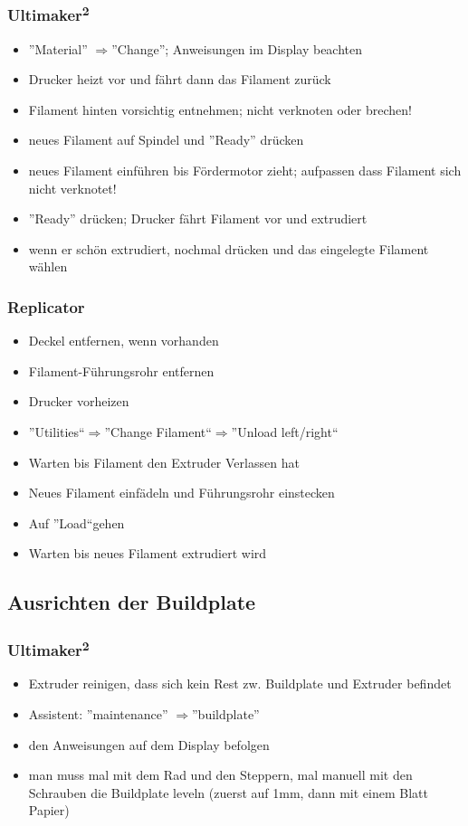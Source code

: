 \documentclass{\basedir/fablab-document}
\newcommand{\ts}[1]{\textsuperscript{#1}}
\newcommand{\ra}{$\Rightarrow$}
\begin{document}
\subsubsection{Ultimaker\ts2}
\begin{itemize}
    \item ''Material'' \ra ''Change''; Anweisungen im Display beachten
    \item Drucker heizt vor und fährt dann das Filament zurück
    \item Filament hinten vorsichtig entnehmen; nicht verknoten oder brechen!
    \item neues Filament auf Spindel und ''Ready'' drücken
    \item neues Filament einführen bis Fördermotor zieht; aufpassen dass Filament sich nicht verknotet!
    \item ''Ready'' drücken; Drucker fährt Filament vor und extrudiert
    \item wenn er schön extrudiert, nochmal drücken und das eingelegte Filament wählen
\end{itemize}

\subsubsection{Replicator}
\begin{itemize}
	\item Deckel entfernen, wenn vorhanden
	\item Filament-Führungsrohr entfernen
	\item Drucker vorheizen
	\item ''Utilities``\ra ''Change Filament``\ra ''Unload left/right``
	\item Warten bis Filament den Extruder Verlassen hat
	\item Neues Filament einfädeln und Führungsrohr einstecken
	\item Auf ''Load``gehen
	\item Warten bis neues Filament extrudiert wird
\end{itemize}

\subsection{Ausrichten der Buildplate}

\subsubsection{Ultimaker\ts2}
\begin{itemize}
\item Extruder reinigen, dass sich kein Rest zw. Buildplate und Extruder befindet
\item Assistent: ''maintenance'' \ra ''buildplate''
\item den Anweisungen auf dem Display befolgen
\item man muss mal mit dem Rad und den Steppern, mal manuell mit den Schrauben die Buildplate leveln (zuerst auf 1mm, dann mit einem Blatt Papier)
\end{itemize}
\end{document}
